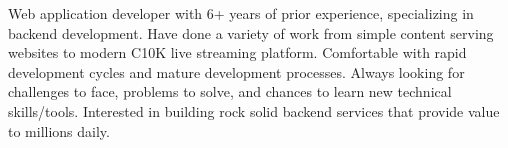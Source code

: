 

\begin{cvparagraph}

Web application developer with 6+ years of prior experience, specializing in backend development. Have done a variety of work from simple content serving websites to modern C10K live streaming platform. Comfortable with rapid development cycles and mature development processes. Always looking for challenges to face, problems to solve, and chances to learn new technical skills/tools. Interested in building rock solid backend services that provide value to millions daily.
\end{cvparagraph}
